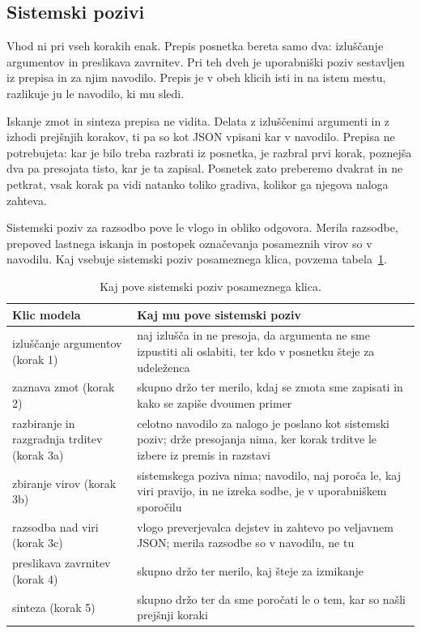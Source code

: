 \documentclass[a4paper, 12pt]{book}
\begin{document}
\subsection{Sistemski pozivi}
\label{ssec:sistemski-poziv}

Vhod ni pri vseh korakih enak. Prepis posnetka bereta samo dva: izluščanje argumentov in preslikava zavrnitev. Pri teh dveh je uporabniški poziv sestavljen iz prepisa in za njim navodilo. Prepis je v obeh klicih isti in na istem mestu, razlikuje ju le navodilo, ki mu sledi.

Iskanje zmot in sinteza prepisa ne vidita. Delata z izluščenimi argumenti in z izhodi prejšnjih korakov, ti pa so kot JSON vpisani kar v navodilo. Prepisa ne potrebujeta: kar je bilo treba razbrati iz posnetka, je razbral prvi korak, poznejša dva pa presojata tisto, kar je ta zapisal. Posnetek zato preberemo dvakrat in ne petkrat, vsak korak pa vidi natanko toliko gradiva, kolikor ga njegova naloga zahteva.

Sistemski poziv za razsodbo pove le vlogo in obliko odgovora. Merila razsodbe, prepoved lastnega iskanja in postopek označevanja posameznih virov so v navodilu. Kaj vsebuje sistemski poziv posameznega klica, povzema tabela~\ref{tbl:hisna}. 

\begin{table}[H]
\centering
\small
{}
\begin{tabular}{@{}p{}p{}@{}}
\toprule
Klic modela & Kaj mu pove sistemski poziv \\
\midrule
izluščanje argumentov (korak 1) & naj izlušča in ne presoja, da argumenta ne sme
izpustiti ali oslabiti, ter kdo v posnetku šteje za udeleženca \\
\midrule
zaznava zmot (korak 2) & skupno držo ter merilo, kdaj se zmota sme zapisati in
kako se zapiše dvoumen primer \\
\midrule
razbiranje in razgradnja trditev (korak 3a) & celotno navodilo za nalogo je
poslano kot sistemski poziv; drže presojanja nima, ker korak trditve le izbere
iz premis in razstavi \\
\midrule
zbiranje virov (korak 3b) & sistemskega poziva nima; navodilo, naj poroča le,
kaj viri pravijo, in ne izreka sodbe, je v uporabniškem sporočilu \\
\midrule
razsodba nad viri (korak 3c) & vlogo preverjevalca dejstev in zahtevo po
veljavnem JSON; merila razsodbe so v navodilu, ne tu \\
\midrule
preslikava zavrnitev (korak 4) & skupno držo ter merilo, kaj šteje za
izmikanje \\
\midrule
sinteza (korak 5) & skupno držo ter da sme poročati le o tem, kar so našli
prejšnji koraki \\
\bottomrule
\end{tabular}
\caption{Kaj pove sistemski poziv posameznega klica.}
\label{tbl:hisna}
\end{table}
\end{document}
